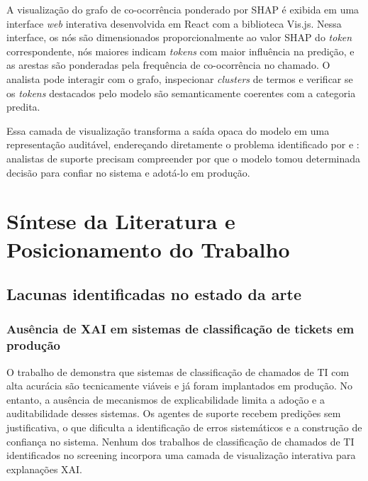 \documentclass[
    12pt,                %
    openright,           %
    oneside,             %
    a4paper,             %
    english,             %
    brazil               %
]{abntex2}
\begin{document}
A visualização do grafo de co-ocorrência ponderado por SHAP é exibida em uma interface \textit{web} interativa desenvolvida em React com a biblioteca Vis.js. Nessa interface, os nós são dimensionados proporcionalmente ao valor SHAP do \textit{token} correspondente, nós maiores indicam \textit{tokens} com maior influência na predição, e as arestas são ponderadas pela frequência de co-ocorrência no chamado. O analista pode interagir com o grafo, inspecionar \textit{clusters} de termos e verificar se os \textit{tokens} destacados pelo modelo são semanticamente coerentes com a categoria predita.

Essa camada de visualização transforma a saída opaca do modelo em uma representação auditável, endereçando diretamente o problema identificado por  e : analistas de suporte precisam compreender por que o modelo tomou determinada decisão para confiar no sistema e adotá-lo em produção.

\section{Síntese da Literatura e Posicionamento do Trabalho}
\label{sec:sintese}

\subsection{Lacunas identificadas no estado da arte}
\label{subsec:sintese_lacunas}

\subsubsection{Ausência de XAI em sistemas de classificação de tickets em produção}
\label{subsubsec:lacuna_xai}

O trabalho de  demonstra que sistemas de classificação de chamados de TI com alta acurácia são tecnicamente viáveis e já foram implantados em produção. No entanto, a ausência de mecanismos de explicabilidade limita a adoção e a auditabilidade desses sistemas. Os agentes de suporte recebem predições sem justificativa, o que dificulta a identificação de erros sistemáticos e a construção de confiança no sistema. Nenhum dos trabalhos de classificação de chamados de TI identificados no screening incorpora uma camada de visualização interativa para explanações XAI.
\end{document}
